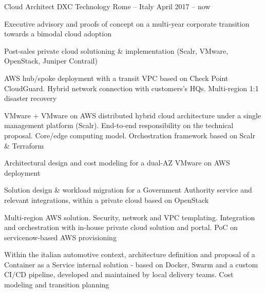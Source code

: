 
\begin{cventries}

  \cventry
    {Cloud Architect} %
    {DXC Technology} %
    {Rome -- Italy} %
    {April 2017 -- now} %
    {
      \begin{cvitems} %
        \item {Executive advisory and proofs of concept on a multi-year corporate transition towards a bimodal cloud adoption}
        \item {Post-sales private cloud solutioning \& implementation (Scalr, VMware, OpenStack, Juniper Contrail)}
        \item {AWS hub/spoke deployment with a transit VPC based on Check Point CloudGuard. Hybrid network connection with customers's HQs. Multi-region 1:1 disaster recovery}
        \item {VMware + VMware on AWS distributed hybrid cloud architecture under a single management platform (Scalr). End-to-end responsibility on the technical proposal. Core/edge computing model. Orchestration framework based on Scalr \& Terraform}
        \item {Architectural design and cost modeling for a dual-AZ VMware on AWS deployment}
        \item {Solution design \& workload migration for a Government Authority service and relevant integrations, within a private cloud based on OpenStack}
        \item {Multi-region AWS solution. Security, network and VPC templating. Integration and orchestration with in-house private cloud solution and portal. PoC on servicenow-based AWS provisioning}
        \item {Within the italian automotive context, architecture definition and proposal of a Container as a Service internal solution - based on Docker, Swarm and a custom CI/CD pipeline, developed and maintained by local delivery teams. Cost modeling and transition planning}
      \end{cvitems}
    }


\end{cventries}

